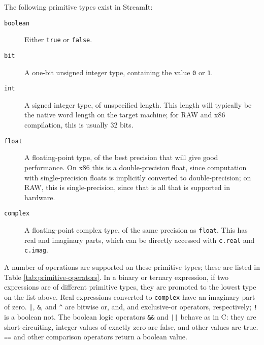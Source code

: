 \documentclass[11pt]{article}
\begin{document}
The following primitive types exist in StreamIt:

\begin{description}
\item[\lstinline|boolean|]  Either \lstinline|true| or
  \lstinline|false|.

\item[\lstinline|bit|]  A one-bit unsigned integer type, containing
  the value \lstinline|0| or \lstinline|1|.

\item[\lstinline|int|]  A signed integer type, of unspecified length.
  This length will typically be the native word length on the target
  machine; for RAW and x86 compilation, this is usually 32 bits.

\item[\lstinline|float|]  A floating-point type, of the best precision
  that will give good performance.  On x86 this is a double-precision
  float, since computation with single-precision floats is implicitly
  converted to double-precision; on RAW, this is single-precision,
  since that is all that is supported in hardware.

\item[\lstinline|complex|]  A floating-point complex type, of the same
  precision as \lstinline|float|.  This has real and imaginary parts,
  which can be directly accessed with \lstinline|c.real| and
  \lstinline|c.imag|.
\end{description}

\label{sec:operators}
A number of operations are supported on these primitive types; these
are listed in Table \ref{tab:primitive-operators}.  In a binary or
ternary expression, if two expressions are of different primitive
types, they are promoted to the lowest type on the list above.  Real
expressions converted to \lstinline|complex| have an imaginary part of
zero.  \lstinline/|/, \lstinline|&|, and \lstinline|^| are bitwise or,
and, and exclusive-or operators, respectively; \lstinline|!| is a
boolean not.  The boolean logic
operators \lstinline|&&| and \lstinline/||/ behave as in C: they are
short-circuiting, integer values of exactly zero are false, and other
values are true.  \lstinline|==| and other comparison operators return
a boolean value.
\end{document}
